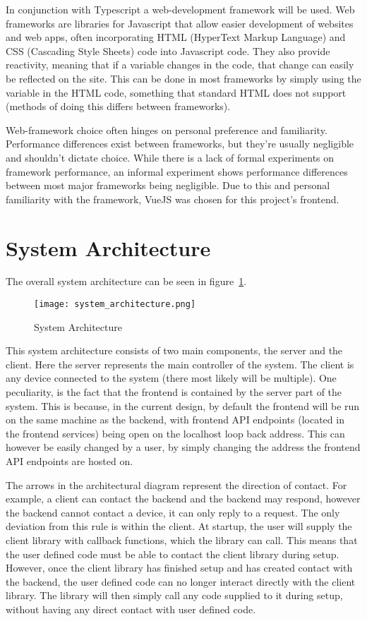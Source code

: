 In conjunction with Typescript a web-development framework will be used. Web frameworks are libraries for Javascript that allow easier development of websites and web apps, often incorporating HTML (HyperText Markup Language) and CSS (Cascading Style Sheets) code into Javascript code. They also provide reactivity, meaning that if a variable changes in the code, that change can easily be reflected on the site. This can be done in most frameworks by simply using the variable in the HTML code, something that standard HTML does not support (methods of doing this differs between frameworks).

Web-framework choice often hinges on personal preference and familiarity. Performance differences exist between frameworks, but they’re usually negligible and shouldn’t dictate choice. While there is a lack of formal experiments on framework performance, an informal experiment \cite{performanceComparisonJS} shows performance differences between most major frameworks being negligible. Due to this and personal familiarity with the framework, VueJS was chosen for this project’s frontend. 


\section{System Architecture} \label{sec:chapdesign:architecture}

The overall system architecture can be seen in figure~\ref{fig:system_architecture}.
\begin{figure}[h]
\caption{System Architecture}
\texttt{[image: system\_architecture.png]}
\label{fig:system_architecture}
\end{figure}
This system architecture consists of two main components, the server and the client. Here the server represents the main controller of the system. The client is any device connected to the system (there most likely will be multiple). One peculiarity, is the fact that the frontend is contained by the server part of the system. This is because, in the current design, by default the frontend will be run on the same machine as the backend, with frontend API endpoints (located in the frontend services) being open on the localhost loop back address. This can however be easily changed by a user, by simply changing the address the frontend API endpoints are hosted on.

The arrows in the architectural diagram represent the direction of contact. For example, a client can contact the backend and the backend may respond, however the backend cannot contact a device, it can only reply to a request. The only deviation from this rule is within the client. At startup, the user will supply the client library with callback functions, which the library can call. This means that the user defined code must be able to contact the client library during setup. However, once the client library has finished setup and has created contact with the backend, the user defined code can no longer interact directly with the client library. The library will then simply call any code supplied to it during setup, without having any direct contact with user defined code.

